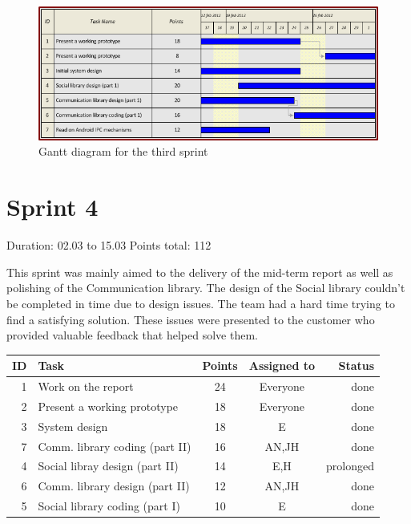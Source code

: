 \begin{figure}[h!]
\centering \includegraphics[scale=0.8]{img/sprints-gantt3.png}
\caption{Gantt diagram for the third sprint}
\label{fig:sprints-gantt3}
\end{figure}

\newpage


\section{Sprint 4}

Duration: 02.03 to 15.03
Points total: 112

This sprint was mainly aimed to the delivery of the mid-term report as well
as polishing of the Communication library. The design of the Social library
couldn't be completed in time due to design issues. The team had a hard
time trying to find a satisfying solution. These issues were presented to the
customer who provided valuable feedback that helped solve them.

\begin{table}[ht!]
\begin{tabular}{ | r | l | c | c | r | }

\hline
\textbf{ID} & \textbf{Task} & \textbf{Points} & \textbf{Assigned to} & \textbf{Status} \\
\hline

 1 & Work on the report				& 24 & Everyone & done \\
\hline
 2 & Present a working prototype	& 18 & Everyone & done \\
\hline
 3 & System design					& 18 & E 		& done \\
\hline
 7 & Comm. library coding (part II)	& 16 & AN,JH	& done \\
\hline
 4 & Social libray design (part II)	& 14 & E,H		& prolonged \\
\hline
 6 & Comm. library design (part II)	& 12 & AN,JH	& done \\
\hline
 5 & Social library coding (part I)	& 10 & E 		& done \\
\hline

\end{tabular}
\end{table}


